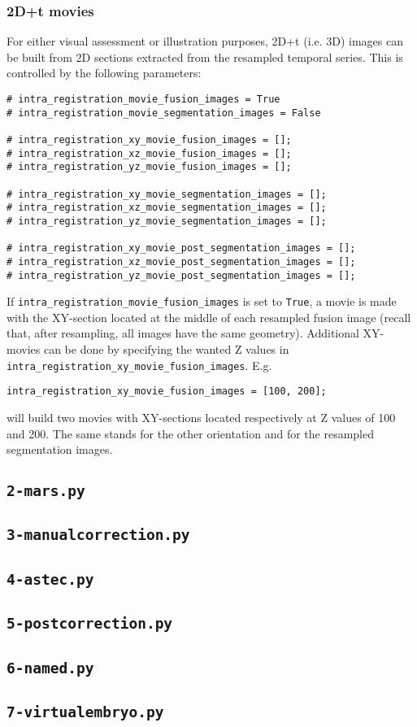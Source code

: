 \subsubsection{2D+t movies}
\label{sec:cli:intraregistration:movies}
For either visual assessment or illustration purposes, 2D+t (i.e. 3D) images can be built from 2D sections extracted from the resampled temporal series. This is controlled by the following parameters:
\begin{verbatim}
# intra_registration_movie_fusion_images = True
# intra_registration_movie_segmentation_images = False

# intra_registration_xy_movie_fusion_images = [];
# intra_registration_xz_movie_fusion_images = [];
# intra_registration_yz_movie_fusion_images = [];

# intra_registration_xy_movie_segmentation_images = [];
# intra_registration_xz_movie_segmentation_images = [];
# intra_registration_yz_movie_segmentation_images = [];

# intra_registration_xy_movie_post_segmentation_images = [];
# intra_registration_xz_movie_post_segmentation_images = [];
# intra_registration_yz_movie_post_segmentation_images = [];
\end{verbatim}

If \verb|intra_registration_movie_fusion_images| is set to \verb|True|, a movie is made with the  XY-section located at the middle of each resampled fusion image (recall that, after resampling, all images have the same geometry). Additional XY-movies can be done by specifying the wanted Z values in \verb|intra_registration_xy_movie_fusion_images|. E.g.
\begin{verbatim}
intra_registration_xy_movie_fusion_images = [100, 200];
\end{verbatim}
will build two movies with XY-sections located respectively at Z values of 100 and 200. The same stands for the other orientation and for the resampled segmentation images.


\subsection{\texttt{2-mars.py}}

\subsection{\texttt{3-manualcorrection.py}}

\subsection{\texttt{4-astec.py}}

\subsection{\texttt{5-postcorrection.py}}

\subsection{\texttt{6-named.py}}

\subsection{\texttt{7-virtualembryo.py}}





